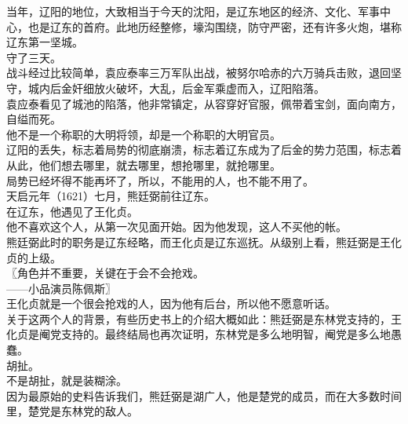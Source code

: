 \begin{multicols}{\theparacolNo}
当年，辽阳的地位，大致相当于今天的沈阳，是辽东地区的经济、文化、军事中心，也是辽东的首府。此地历经整修，壕沟围绕，防守严密，还有许多火炮，堪称辽东第一坚城。\\

守了三天。\\

战斗经过比较简单，袁应泰率三万军队出战，被努尔哈赤的六万骑兵击败，退回坚守，城内后金奸细放火破坏，大乱，后金军乘虚而入，辽阳陷落。\\

袁应泰看见了城池的陷落，他非常镇定，从容穿好官服，佩带着宝剑，面向南方，自缢而死。\\

他不是一个称职的大明将领，却是一个称职的大明官员。\\

辽阳的丢失，标志着局势的彻底崩溃，标志着辽东成为了后金的势力范围，标志着从此，他们想去哪里，就去哪里，想抢哪里，就抢哪里。\\

局势已经坏得不能再坏了，所以，不能用的人，也不能不用了。\\

天启元年（1621）七月，熊廷弼前往辽东。\\

在辽东，他遇见了王化贞。\\

他不喜欢这个人，从第一次见面开始。因为他发现，这人不买他的帐。\\

熊廷弼此时的职务是辽东经略，而王化贞是辽东巡抚。从级别上看，熊廷弼是王化贞的上级。\\

〖角色并不重要，关键在于会不会抢戏。\\

——小品演员陈佩斯〗\\

王化贞就是一个很会抢戏的人，因为他有后台，所以他不愿意听话。\\

关于这两个人的背景，有些历史书上的介绍大概如此：熊廷弼是东林党支持的，王化贞是阉党支持的。最终结局也再次证明，东林党是多么地明智，阉党是多么地愚蠢。\\

胡扯。\\

不是胡扯，就是装糊涂。\\

因为最原始的史料告诉我们，熊廷弼是湖广人，他是楚党的成员，而在大多数时间里，楚党是东林党的敌人。\\


\end{multicols}
